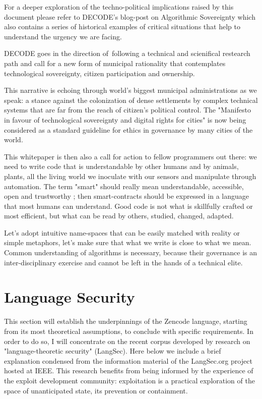 \documentclass{svproc}
\begin{document}
For a deeper exploration of the techno-political implications raised
by this document please refer to DECODE's blog-post on Algorithmic
Sovereignty which also contains a series of historical examples of
critical situations that help to understand the urgency we are facing.

DECODE goes in the direction of following a technical and scienifical
restearch path and call for a new form of municipal rationality that
contemplates technological sovereignty, citizen participation and
ownership.

This narrative is echoing through world's biggest municipal
administrations as we speak: a stance against the colonization of
dense settlements by complex technical systems that are far from the
reach of citizen's political control. The "Manifesto in favour of
technological sovereignty and digital rights for cities" is now being
considered as a standard guideline for ethics in governance by many
cities of the world.

This whitepaper is then also a call for action to fellow programmers
out there: we need to write code that is understandable by other
humans and by animals, plants, all the living world we inoculate with
our sensors and manipulate through automation. The term "smart" should
really mean understandable, accessible, open and trustworthy
\cite{nevejan2007}; then smart-contracts should be expressed in a
language that most humans can understand. Good code is not what is
skillfully crafted or most efficient, but what can be read by others,
studied, changed, adapted.

Let's adopt intuitive name-spaces that can be easily matched with
reality or simple metaphors, let's make sure that what we write is
close to what we mean. Common understanding of algorithms is
necessary, because their governance is an inter-disciplinary exercise
and cannot be left in the hands of a technical elite.

%
\section{Language Security}
%

This section will establish the underpinnings of the Zencode language,
starting from its most theoretical assumptions, to conclude with
specific requirements. In order to do so, I will concentrate on the
recent corpus developed by research on "language-theoretic security"
(LangSec). Here below we include a brief explanation condensed from
the information material of the LangSec.org project hosted at
IEEE. This research benefits from being informed by the experience of
the exploit development community: exploitation is a practical
exploration of the space of unanticipated state, its prevention or
containment.
\end{document}
